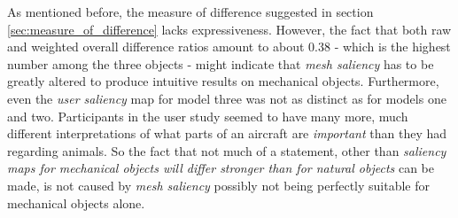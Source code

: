 As mentioned before, the measure of difference suggested in section \ref{sec:measure_of_difference} lacks expressiveness. However, the fact that both raw and weighted overall difference ratios amount to about 0.38 - which is the highest number among the three objects - might indicate that \textit{mesh saliency} has to be greatly altered to produce intuitive results on mechanical objects. Furthermore, even the \textit{user saliency} map for model three was not as distinct as for models one and two. Participants in the user study seemed to have many more, much different interpretations of what parts of an aircraft are \textit{important} than they had regarding animals. So the fact that not much of a statement, other than \textit{saliency maps for mechanical objects will differ stronger than for natural objects} can be made, is not caused by \textit{mesh saliency} possibly not being perfectly suitable for mechanical objects alone.
